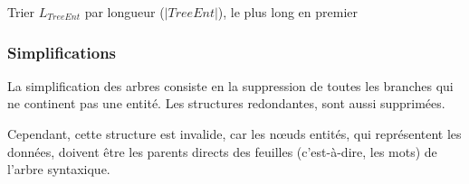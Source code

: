 \begin{algorithm}[H]
    \caption{$\textsf{ins\_ent\_list}(T = (D, t), L_{TreeEnt}, L_{Rels})$}

        Trier $L_{TreeEnt}$ par longueur ($|TreeEnt|$), le plus long en premier\;




\end{algorithm}

\subsubsection{Simplifications}

La simplification des arbres consiste en la suppression de toutes les branches qui ne continent pas une entité.
Les structures redondantes, sont aussi supprimées.


Cependant, cette structure est invalide, car les nœuds entités, qui représentent les données, doivent être les parents directs des feuilles (c'est-à-dire, les mots) de l'arbre syntaxique.


